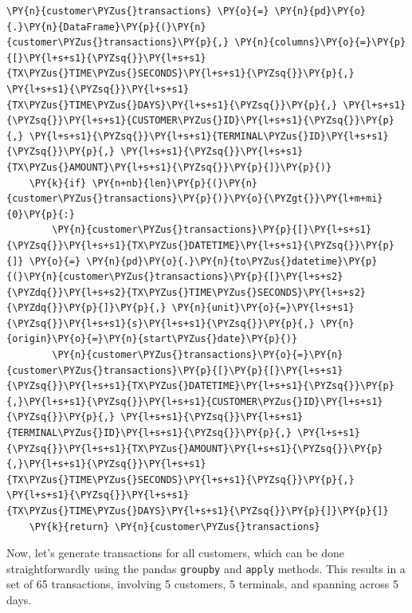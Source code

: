 \begin{tcolorbox}[breakable, size=fbox, boxrule=1pt, pad at break*=1mm,colback=cellbackground, colframe=cellborder]
\begin{Verbatim}[commandchars=\\\{\}]
    \PY{n}{customer\PYZus{}transactions} \PY{o}{=} \PY{n}{pd}\PY{o}{.}\PY{n}{DataFrame}\PY{p}{(}\PY{n}{customer\PYZus{}transactions}\PY{p}{,} \PY{n}{columns}\PY{o}{=}\PY{p}{[}\PY{l+s+s1}{\PYZsq{}}\PY{l+s+s1}{TX\PYZus{}TIME\PYZus{}SECONDS}\PY{l+s+s1}{\PYZsq{}}\PY{p}{,} \PY{l+s+s1}{\PYZsq{}}\PY{l+s+s1}{TX\PYZus{}TIME\PYZus{}DAYS}\PY{l+s+s1}{\PYZsq{}}\PY{p}{,} \PY{l+s+s1}{\PYZsq{}}\PY{l+s+s1}{CUSTOMER\PYZus{}ID}\PY{l+s+s1}{\PYZsq{}}\PY{p}{,} \PY{l+s+s1}{\PYZsq{}}\PY{l+s+s1}{TERMINAL\PYZus{}ID}\PY{l+s+s1}{\PYZsq{}}\PY{p}{,} \PY{l+s+s1}{\PYZsq{}}\PY{l+s+s1}{TX\PYZus{}AMOUNT}\PY{l+s+s1}{\PYZsq{}}\PY{p}{]}\PY{p}{)}
    \PY{k}{if} \PY{n+nb}{len}\PY{p}{(}\PY{n}{customer\PYZus{}transactions}\PY{p}{)}\PY{o}{\PYZgt{}}\PY{l+m+mi}{0}\PY{p}{:}
        \PY{n}{customer\PYZus{}transactions}\PY{p}{[}\PY{l+s+s1}{\PYZsq{}}\PY{l+s+s1}{TX\PYZus{}DATETIME}\PY{l+s+s1}{\PYZsq{}}\PY{p}{]} \PY{o}{=} \PY{n}{pd}\PY{o}{.}\PY{n}{to\PYZus{}datetime}\PY{p}{(}\PY{n}{customer\PYZus{}transactions}\PY{p}{[}\PY{l+s+s2}{\PYZdq{}}\PY{l+s+s2}{TX\PYZus{}TIME\PYZus{}SECONDS}\PY{l+s+s2}{\PYZdq{}}\PY{p}{]}\PY{p}{,} \PY{n}{unit}\PY{o}{=}\PY{l+s+s1}{\PYZsq{}}\PY{l+s+s1}{s}\PY{l+s+s1}{\PYZsq{}}\PY{p}{,} \PY{n}{origin}\PY{o}{=}\PY{n}{start\PYZus{}date}\PY{p}{)}
        \PY{n}{customer\PYZus{}transactions}\PY{o}{=}\PY{n}{customer\PYZus{}transactions}\PY{p}{[}\PY{p}{[}\PY{l+s+s1}{\PYZsq{}}\PY{l+s+s1}{TX\PYZus{}DATETIME}\PY{l+s+s1}{\PYZsq{}}\PY{p}{,}\PY{l+s+s1}{\PYZsq{}}\PY{l+s+s1}{CUSTOMER\PYZus{}ID}\PY{l+s+s1}{\PYZsq{}}\PY{p}{,} \PY{l+s+s1}{\PYZsq{}}\PY{l+s+s1}{TERMINAL\PYZus{}ID}\PY{l+s+s1}{\PYZsq{}}\PY{p}{,} \PY{l+s+s1}{\PYZsq{}}\PY{l+s+s1}{TX\PYZus{}AMOUNT}\PY{l+s+s1}{\PYZsq{}}\PY{p}{,}\PY{l+s+s1}{\PYZsq{}}\PY{l+s+s1}{TX\PYZus{}TIME\PYZus{}SECONDS}\PY{l+s+s1}{\PYZsq{}}\PY{p}{,} \PY{l+s+s1}{\PYZsq{}}\PY{l+s+s1}{TX\PYZus{}TIME\PYZus{}DAYS}\PY{l+s+s1}{\PYZsq{}}\PY{p}{]}\PY{p}{]}
    \PY{k}{return} \PY{n}{customer\PYZus{}transactions}
\end{Verbatim}
\end{tcolorbox}

    Now, let's generate transactions for all customers, which can be done
straightforwardly using the pandas \texttt{groupby} and \texttt{apply}
methods. This results in a set of 65 transactions, involving 5
customers, 5 terminals, and spanning across 5 days.

